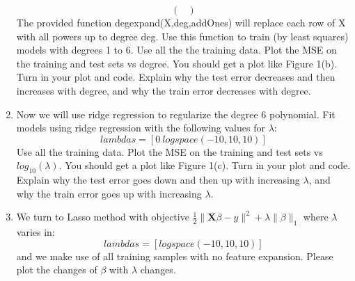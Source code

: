 \documentclass[11pt]{article}
\newcommand{\mtx}[1]{\mathbf{#1}}
\newcommand{\vct}[1]{\mathbf{#1}}
\def \mU {\mtx{U}}
\def \mS {\mtx{S}}
\def \mX {\mtx{X}}
\def \vu {\vct{u}}
\begin{document}
\begin{enumerate}
\begin{equation}
\begin{pmatrix}
		\end{pmatrix}
	\end{equation}
The provided function degexpand(X,deg,addOnes) will replace each row of X with all powers up to degree deg. Use
this function to train (by least squares) models with degrees 1 to 6. Use all the the training data. Plot the MSE on
the training and test sets vs degree. You should get a plot like Figure 1(b). Turn in your plot and code. Explain
why the test error decreases and then increases with degree, and why the train error decreases with degree.
\item Now we will use ridge regression to regularize the degree 6 polynomial. Fit models using ridge regression with
the following values for $\lambda$:
$$lambdas=[0 \  logspace(-10,10,10)]$$
Use all the training data. Plot the MSE on the training and test sets vs $log_{10}(\lambda)$. You should get a plot like
Figure 1(c). Turn in your plot and code. Explain why the test error goes down and then up with increasing $\lambda$,
and why the train error goes up with increasing $\lambda$.
\item We turn to Lasso method with objective $\frac{1}{2}\|\mX \beta-y\|^2+\lambda\|\beta\|_1$ where $\lambda$ varies in: $$lambdas=[logspace(-10,10,10)]$$ and we make use of all training samples with no feature expansion. Please plot the changes of $\beta$ with $\lambda$ changes.
\end{enumerate}

\end{document}
